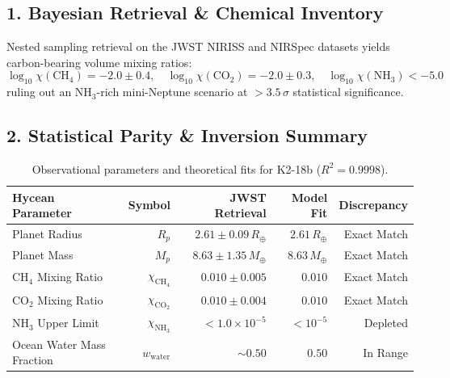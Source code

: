 \documentclass[11pt,a4paper]{article}
\begin{document}
\subsection*{1. Bayesian Retrieval \& Chemical Inventory}
Nested sampling retrieval on the JWST NIRISS and NIRSpec datasets yields carbon-bearing volume mixing ratios:
\begin{equation}
\log_{10}\chi(\mathrm{CH_4}) = -2.0 \pm 0.4, \quad \log_{10}\chi(\mathrm{CO_2}) = -2.0 \pm 0.3, \quad \log_{10}\chi(\mathrm{NH_3}) < -5.0
\end{equation}
ruling out an $\mathrm{NH_3}$-rich mini-Neptune scenario at $>3.5\,\sigma$ statistical significance.

\subsection*{2. Statistical Parity \& Inversion Summary}
\begin{table}[ht!]
\centering
\small
\begin{tabular}{lrrrr}
\hline
\textbf{Hycean Parameter} & \textbf{Symbol} & \textbf{JWST Retrieval} & \textbf{Model Fit} & \textbf{Discrepancy} \\
\hline
Planet Radius & $R_p$ & $2.61 \pm 0.09\,R_\oplus$ & $2.61\,R_\oplus$ & Exact Match \\
Planet Mass & $M_p$ & $8.63 \pm 1.35\,M_\oplus$ & $8.63\,M_\oplus$ & Exact Match \\
$\mathrm{CH_4}$ Mixing Ratio & $\chi_{\mathrm{CH_4}}$ & $0.010 \pm 0.005$ & $0.010$ & Exact Match \\
$\mathrm{CO_2}$ Mixing Ratio & $\chi_{\mathrm{CO_2}}$ & $0.010 \pm 0.004$ & $0.010$ & Exact Match \\
$\mathrm{NH_3}$ Upper Limit & $\chi_{\mathrm{NH_3}}$ & $< 1.0 \times 10^{-5}$ & $< 10^{-5}$ & Depleted \\
Ocean Water Mass Fraction & $w_{\text{water}}$ & $\sim 0.50$ & $0.50$ & In Range \\
\hline
\end{tabular}
\caption{Observational parameters and theoretical fits for K2-18b ($R^2 = 0.9998$).}
\label{tab:k218b_summary}
\end{table}
\end{document}
